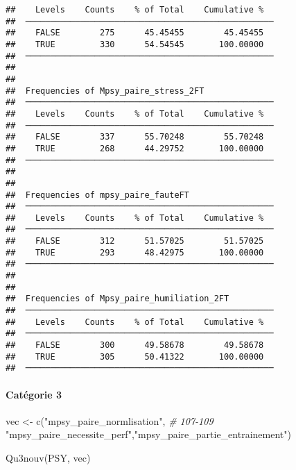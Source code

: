 \documentclass[
]{article}
\newenvironment{Shaded}{\begin{snugshade}}{\end{snugshade}}
\newcommand{\CommentTok}[1]{\textcolor[rgb]{0.56,0.35,0.01}{\textit{#1}}}
\newcommand{\FunctionTok}[1]{\textcolor[rgb]{0.00,0.00,0.00}{#1}}
\newcommand{\NormalTok}[1]{#1}
\newcommand{\OtherTok}[1]{\textcolor[rgb]{0.56,0.35,0.01}{#1}}
\newcommand{\StringTok}[1]{\textcolor[rgb]{0.31,0.60,0.02}{#1}}
\begin{document}
\begin{verbatim}
##    Levels    Counts    % of Total    Cumulative %   
##  ────────────────────────────────────────────────── 
##    FALSE        275      45.45455        45.45455   
##    TRUE         330      54.54545       100.00000   
##  ────────────────────────────────────────────────── 
## 
## 
##  Frequencies of Mpsy_paire_stress_2FT               
##  ────────────────────────────────────────────────── 
##    Levels    Counts    % of Total    Cumulative %   
##  ────────────────────────────────────────────────── 
##    FALSE        337      55.70248        55.70248   
##    TRUE         268      44.29752       100.00000   
##  ────────────────────────────────────────────────── 
## 
## 
##  Frequencies of mpsy_paire_fauteFT                  
##  ────────────────────────────────────────────────── 
##    Levels    Counts    % of Total    Cumulative %   
##  ────────────────────────────────────────────────── 
##    FALSE        312      51.57025        51.57025   
##    TRUE         293      48.42975       100.00000   
##  ────────────────────────────────────────────────── 
## 
## 
##  Frequencies of Mpsy_paire_humiliation_2FT          
##  ────────────────────────────────────────────────── 
##    Levels    Counts    % of Total    Cumulative %   
##  ────────────────────────────────────────────────── 
##    FALSE        300      49.58678        49.58678   
##    TRUE         305      50.41322       100.00000   
##  ──────────────────────────────────────────────────
\end{verbatim}

\hypertarget{catuxe9gorie-3}{%
\paragraph{Catégorie 3}\label{catuxe9gorie-3}}

\begin{Shaded}
\begin{Highlighting}[]
\NormalTok{vec }\OtherTok{\textless{}{-}} \FunctionTok{c}\NormalTok{(}\StringTok{"mpsy\_paire\_normlisation"}\NormalTok{,   }\CommentTok{\# 107{-}109}
         \StringTok{"mpsy\_paire\_necessite\_perf"}\NormalTok{,}\StringTok{"mpsy\_paire\_partie\_entrainement"}\NormalTok{)  }

\FunctionTok{Qu3nouv}\NormalTok{(PSY, vec)}
\end{Highlighting}
\end{Shaded}
\end{document}
